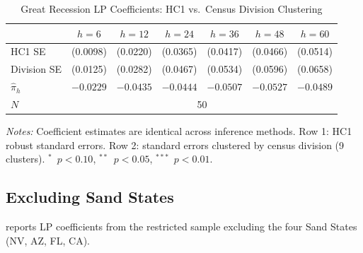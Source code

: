 \documentclass[12pt]{article}
\begin{document}
\begin{table}[H]
\centering
\caption{Great Recession LP Coefficients: HC1 vs.\ Census Division Clustering}
\label{tab:app_cluster}
\begin{threeparttable}
\small
\begin{tabular}{lcccccc}
\toprule
& $h=6$ & $h=12$ & $h=24$ & $h=36$ & $h=48$ & $h=60$ \\
\midrule
HC1 SE & (0.0098) & (0.0220) & (0.0365) & (0.0417) & (0.0466) & (0.0514) \\
Division SE & (0.0125) & (0.0282) & (0.0467) & (0.0534) & (0.0596) & (0.0658) \\
\midrule
$\hat{\pi}_h$ & $-0.0229$ & $-0.0435$ & $-0.0444$ & $-0.0507$ & $-0.0527$ & $-0.0489$ \\
\midrule
$N$ & \multicolumn{6}{c}{50} \\
\bottomrule
\end{tabular}
\begin{tablenotes}[flushleft]
\small
\item \textit{Notes:} Coefficient estimates are identical across inference methods. Row 1: HC1 robust standard errors. Row 2: standard errors clustered by census division (9 clusters). $^{*}$~$p<0.10$, $^{**}$~$p<0.05$, $^{***}$~$p<0.01$.
\end{tablenotes}
\end{threeparttable}
\end{table}

\subsection{Excluding Sand States}

 reports LP coefficients from the restricted sample excluding the four Sand States (NV, AZ, FL, CA).
\end{document}
